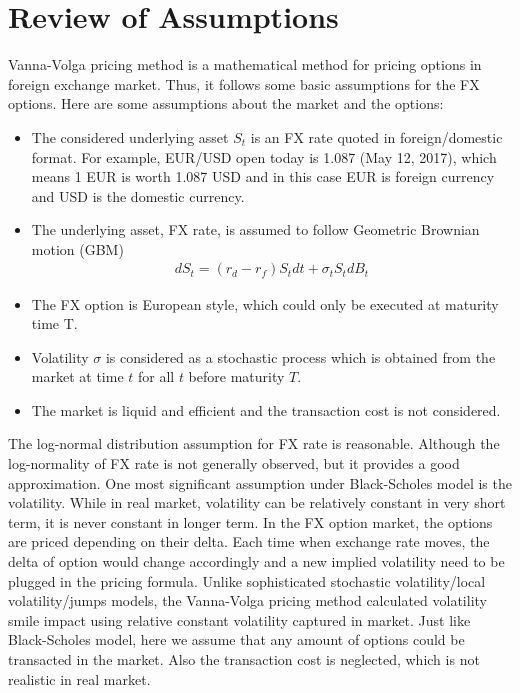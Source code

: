 \chapter{Review of Assumptions}

Vanna-Volga pricing method is a mathematical method for pricing options in foreign exchange market. Thus, it follows some basic assumptions for the FX options. Here are some assumptions about the market and the options:
\begin{itemize}
	\item The considered underlying asset $S_t$ is an FX rate quoted in foreign/domestic format. For example, EUR/USD open today is 1.087 (May 12, 2017), which means 1 EUR is worth 1.087 USD and in this case EUR is foreign currency and USD is the domestic currency.
	\item The underlying asset, FX rate, is assumed to follow Geometric Brownian motion (GBM)
	\begin{align}
	dS_t = \left( r_d - r_f\right) S_tdt + \sigma_t S_t dB_t
	\end{align}  
	\item The FX option is European style, which could only be executed at maturity time T.
	\item Volatility $\sigma$ is considered as a stochastic process which is obtained from the market at time $t$ for all $t$ before maturity $T$. 
	\item The market is liquid and efficient and the transaction cost is not considered.
\end{itemize}
The log-normal distribution assumption for FX rate is reasonable. Although the log-normality of FX rate is not generally observed, but it provides a good approximation. 
\newline
\newline
One most significant assumption under Black-Scholes model is the volatility. While in real market, volatility can be relatively constant in very short term, it is never constant in longer term. In the FX option market, the options are priced depending on their delta. Each time when exchange rate moves, the delta of option would change accordingly and a new implied volatility need to be plugged in the pricing formula. Unlike sophisticated stochastic volatility/local volatility/jumps models, the Vanna-Volga pricing method calculated volatility smile impact using relative constant volatility captured in market. 
\newline
\newline
Just like Black-Scholes model, here we assume that any amount of options could be transacted in the market. Also the transaction cost is neglected, which is not realistic in real market.